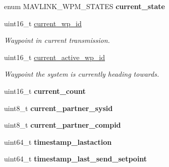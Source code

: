 \begin{DoxyCompactItemize}
\item 
\mbox{\label{structmavlink__wpm__storage_a8dc08aadcce998279d7dc32b16b45ccb}} 
enum M\+A\+V\+L\+I\+N\+K\+\_\+\+W\+P\+M\+\_\+\+S\+T\+A\+T\+ES {\bfseries current\+\_\+state}
\item 
\mbox{\label{structmavlink__wpm__storage_a6bd44a64c46b8a8ce034b4e4764bc17f}} 
uint16\+\_\+t \hyperlink{structmavlink__wpm__storage_a6bd44a64c46b8a8ce034b4e4764bc17f}{current\+\_\+wp\+\_\+id}
\begin{DoxyCompactList}\small\item\em Waypoint in current transmission. \end{DoxyCompactList}\item 
\mbox{\label{structmavlink__wpm__storage_a8f3b090fd85b75be995fc21ead4c3237}} 
uint16\+\_\+t \hyperlink{structmavlink__wpm__storage_a8f3b090fd85b75be995fc21ead4c3237}{current\+\_\+active\+\_\+wp\+\_\+id}
\begin{DoxyCompactList}\small\item\em Waypoint the system is currently heading towards. \end{DoxyCompactList}\item 
\mbox{\label{structmavlink__wpm__storage_ae8ec70a53b4e8e41b27e1a7d0636b563}} 
uint16\+\_\+t {\bfseries current\+\_\+count}
\item 
\mbox{\label{structmavlink__wpm__storage_ae7646067b29a0e90e7783a0dac510802}} 
uint8\+\_\+t {\bfseries current\+\_\+partner\+\_\+sysid}
\item 
\mbox{\label{structmavlink__wpm__storage_aeb24b1e57dc3caca5f8478a53fcde264}} 
uint8\+\_\+t {\bfseries current\+\_\+partner\+\_\+compid}
\item 
\mbox{\label{structmavlink__wpm__storage_a2a9513d0fdedb58b99c2651b33b3a51e}} 
uint64\+\_\+t {\bfseries timestamp\+\_\+lastaction}
\item 
\mbox{\label{structmavlink__wpm__storage_a1410b4ae2ba02af85ae0b78862b336d3}} 
uint64\+\_\+t {\bfseries timestamp\+\_\+last\+\_\+send\+\_\+setpoint}

\end{DoxyCompactItemize}
